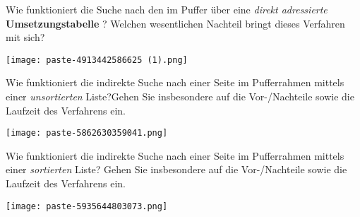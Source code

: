 \documentclass{article}
\begin{document}
\begin{tcolorbox}[colback=white!10!white,colframe=lightgray!75!black,
  savelowerto=\jobname_ex.tex,breakable,enhanced,lines before break=40]

\begin{center}
 Wie funktioniert die Suche nach den im Puffer über eine 
\textit{direkt adressierte 
}\textbf{Umsetzungstabelle
}? Welchen wesentlichen Nachteil bringt dieses Verfahren mit sich? 

\end{center}

\tcblower

\justifying
\texttt{[image: paste-4913442586625 (1).png]}

\end{tcolorbox}
\begin{tcolorbox}[colback=white!10!white,colframe=lightgray!75!black,
  savelowerto=\jobname_ex.tex,breakable,enhanced,lines before break=40]

\begin{center}
 Wie funktioniert die indirekte Suche nach einer Seite im Pufferrahmen mittels einer 
\textit{unsortierten
} Liste?Gehen Sie insbesondere auf die Vor-/Nachteile sowie die Laufzeit des Verfahrens ein. 

\end{center}

\tcblower

\justifying
\texttt{[image: paste-5862630359041.png]}

\end{tcolorbox}
\begin{tcolorbox}[colback=white!10!white,colframe=lightgray!75!black,
  savelowerto=\jobname_ex.tex,breakable,enhanced,lines before break=40]

\begin{center}
 Wie funktioniert die indirekte Suche nach einer Seite im Pufferrahmen mittels einer
\textit{sortierten
} Liste? Gehen Sie insbesondere auf die Vor-/Nachteile sowie die Laufzeit des Verfahrens ein. 

\end{center}

\tcblower

\justifying
\texttt{[image: paste-5935644803073.png]}

\end{tcolorbox}
\end{document}
